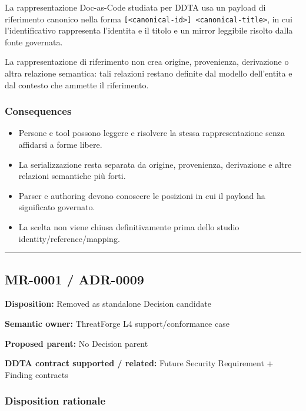 \documentclass[
  10pt,
  a4paper,
]{article}
\providecommand{\tightlist}{%
  \setlength{\itemsep}{0pt}\setlength{\parskip}{0pt}}
\begin{document}
La rappresentazione Doc-as-Code studiata per DDTA usa un payload di
riferimento canonico nella forma
\texttt{{[}\textless{}canonical-id\textgreater{}{]}\ \textless{}canonical-title\textgreater{}},
in cui l'identificativo rappresenta l'identita e il titolo e un mirror
leggibile risolto dalla fonte governata.

La rappresentazione di riferimento non crea origine, provenienza,
derivazione o altra relazione semantica: tali relazioni restano definite
dal modello dell'entita e dal contesto che ammette il riferimento.

\subsubsection{Consequences}\label{consequences-6}

\begin{itemize}
\tightlist
\item
  Persone e tool possono leggere e risolvere la stessa rappresentazione
  senza affidarsi a forme libere.
\item
  La serializzazione resta separata da origine, provenienza, derivazione
  e altre relazioni semantiche più forti.
\item
  Parser e authoring devono conoscere le posizioni in cui il payload ha
  significato governato.
\item
  La scelta non viene chiusa definitivamente prima dello studio
  identity/reference/mapping.
\end{itemize}

\begin{center}\rule{0.5\linewidth}{0.5pt}\end{center}

\subsection{MR-0001 / ADR-0009}\label{mr-0001-adr-0009}

\textbf{Disposition:} Removed as standalone Decision candidate

\textbf{Semantic owner:} ThreatForge L4 support/conformance case

\textbf{Proposed parent:} No Decision parent

\textbf{DDTA contract supported / related:} Future Security Requirement
+ Finding contracts

\subsubsection{Disposition rationale}\label{disposition-rationale}
\end{document}

